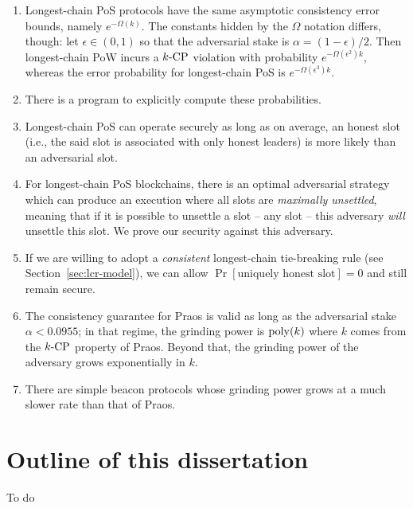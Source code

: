 \begin{enumerate}
  \item Longest-chain PoS protocols have the same asymptotic 
  consistency error bounds, namely $e^{-\Omega(k)}$. 
  The constants hidden by the $\Omega$ notation differs, though: 
  let $\epsilon \in (0,1)$ so that 
  the adversarial stake is $\alpha = (1-\epsilon)/2$. 
  Then longest-chain PoW incurs a ${k}\text{-}\mathrm{CP}$ violation with probability $e^{-\Omega(\epsilon^2)k}$, 
  whereas the error probability for longest-chain PoS is $e^{-\Omega(\epsilon^3)k}$.

  \item There is a program to explicitly compute these probabilities.

  \item Longest-chain PoS can operate securely as long as on average, an honest slot 
  (i.e., the said slot is associated with only honest leaders) 
  is more likely than an adversarial slot.

  \item For longest-chain PoS blockchains, 
  there is an optimal adversarial strategy 
  which can produce an execution 
  where all slots are \emph{maximally unsettled}, meaning that 
  if it is possible to unsettle a slot -- any slot -- 
  this adversary \emph{will} unsettle this slot. 
  We prove our security against this adversary.

  \item If we are willing to adopt a \emph{consistent} 
  longest-chain tie-breaking rule (see Section~\ref{sec:lcr-model}), 
  we can allow $\Pr[\text{uniquely honest slot}] = 0$ 
  and still remain secure.

  \item The consistency guarantee for Praos is valid 
  as long as the adversarial stake $\alpha < 0.0955$; 
  in that regime, the grinding power is $\mathrm{poly}(k)$ 
  where $k$ comes from the ${k}\text{-}\mathrm{CP}$ property of Praos. 
  Beyond that, the grinding power of the adversary grows exponentially in $k$.

  \item There are simple beacon protocols 
  whose grinding power grows at a much slower rate than that of Praos.
\end{enumerate}




\section{Outline of this dissertation}
To do







